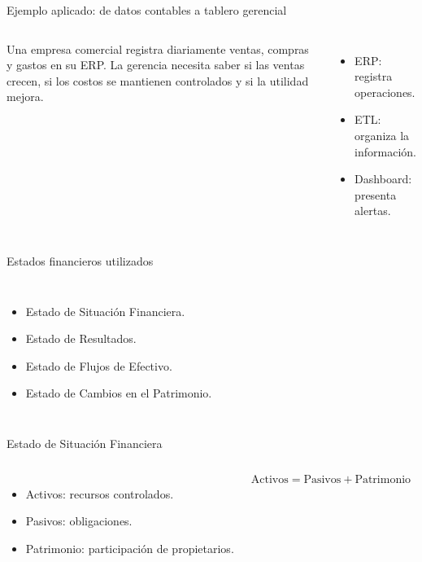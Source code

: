 \begin{frame}{Ejemplo aplicado: de datos contables a tablero gerencial}
  \begin{columns}[T,onlytextwidth]
    \footnotesize
    Una empresa comercial registra diariamente ventas, compras y gastos en su ERP. La gerencia necesita saber si las ventas crecen, si los costos se mantienen controlados y si la utilidad mejora.

    \vspace{0.35em}
    \begin{itemize}
      \item ERP: registra operaciones.
      \item ETL: organiza la información.
      \item Dashboard: presenta alertas.
    \end{itemize}
  \end{columns}
\end{frame}

\begin{frame}{Estados financieros utilizados}
  \begin{columns}[T,onlytextwidth]
    \begin{itemize}
      \item Estado de Situación Financiera.
      \item Estado de Resultados.
      \item Estado de Flujos de Efectivo.
      \item Estado de Cambios en el Patrimonio.
    \end{itemize}
  \end{columns}
\end{frame}

\begin{frame}{Estado de Situación Financiera}
  \begin{columns}[T,onlytextwidth]
    \begin{itemize}
      \item Activos: recursos controlados.
      \item Pasivos: obligaciones.
      \item Patrimonio: participación de propietarios.
    \end{itemize}
    \[
      \text{Activos}=\text{Pasivos}+\text{Patrimonio}
    \]
  \end{columns}
\end{frame}

